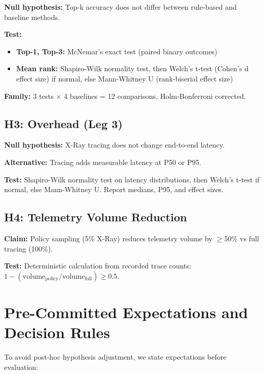 \textbf{Null hypothesis:} Top-k accuracy does not differ between rule-based and baseline methods.

\textbf{Test:}
\begin{itemize}
    \item \textbf{Top-1, Top-3:} McNemar's exact test (paired binary outcomes)
    \item \textbf{Mean rank:} Shapiro-Wilk normality test, then Welch's t-test (Cohen's d effect size) if normal, else Mann-Whitney U (rank-biserial effect size)
\end{itemize}

\textbf{Family:} 3 tests × 4 baselines = 12 comparisons, Holm-Bonferroni corrected.

\subsection{H3: Overhead (Leg 3)}

\textbf{Null hypothesis:} X-Ray tracing does not change end-to-end latency.

\textbf{Alternative:} Tracing adds measurable latency at P50 or P95.

\textbf{Test:} Shapiro-Wilk normality test on latency distributions, then Welch's t-test if normal, else Mann-Whitney U. Report medians, P95, and effect sizes.

\subsection{H4: Telemetry Volume Reduction}

\textbf{Claim:} Policy sampling (5\% X-Ray) reduces telemetry volume by $\geq$50\% vs full tracing (100\%).

\textbf{Test:} Deterministic calculation from recorded trace counts: $1 - (\text{volume}_{\text{policy}} / \text{volume}_{\text{full}}) \geq 0.5$.

\section{Pre-Committed Expectations and Decision Rules}

To avoid post-hoc hypothesis adjustment, we state expectations before evaluation:

